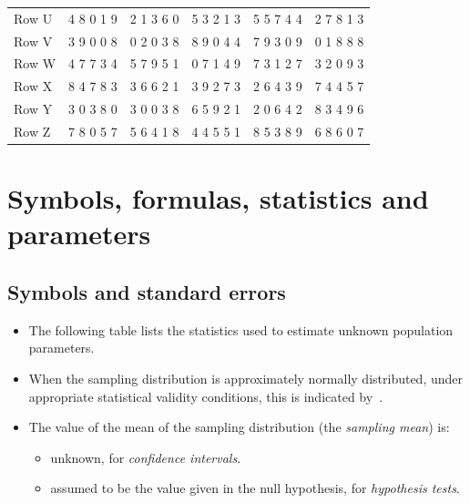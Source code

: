 \documentclass[
  11pt,
  a4paper,
  krantz2]{krantz}
\providecommand{\tightlist}{%
  \setlength{\itemsep}{0pt}\setlength{\parskip}{0pt}}
\begin{document}
\begin{table}
\begin{tabular}[t]{llllll}
\addlinespace
Row U & 4 8 0 1 9 & 2 1 3 6 0 & 5 3 2 1 3 & 5 5 7 4 4 & 2 7 8 1 3\\
Row V & 3 9 0 0 8 & 0 2 0 3 8 & 8 9 0 4 4 & 7 9 3 0 9 & 0 1 8 8 8\\
Row W & 4 7 7 3 4 & 5 7 9 5 1 & 0 7 1 4 9 & 7 3 1 2 7 & 3 2 0 9 3\\
Row X & 8 4 7 8 3 & 3 6 6 2 1 & 3 9 2 7 3 & 2 6 4 3 9 & 7 4 4 5 7\\
Row Y & 3 0 3 8 0 & 3 0 0 3 8 & 6 5 9 2 1 & 2 0 6 4 2 & 8 3 4 9 6\\
\addlinespace
Row Z & 7 8 0 5 7 & 5 6 4 1 8 & 4 4 5 5 1 & 8 5 3 8 9 & 6 8 6 0 7\\
\bottomrule
\end{tabular}
\end{table}

\chapter{Symbols, formulas, statistics and parameters}\label{StatisticsAndParameters}

\section{Symbols and standard errors}\label{Symbols}

\begin{itemize}
\item
  The following table lists the statistics used to estimate unknown population parameters. \tightlist
\item
  When the sampling distribution is approximately normally distributed, under appropriate statistical validity conditions, this is indicated by~.
\item
  The value of the mean of the sampling distribution (the \emph{sampling mean}) is:

  \begin{itemize}
  \tightlist
  \item
    unknown, for \emph{confidence intervals}.
  \item
    assumed to be the value given in the null hypothesis, for \emph{hypothesis tests}.
  \end{itemize}
\end{itemize}
\end{document}
